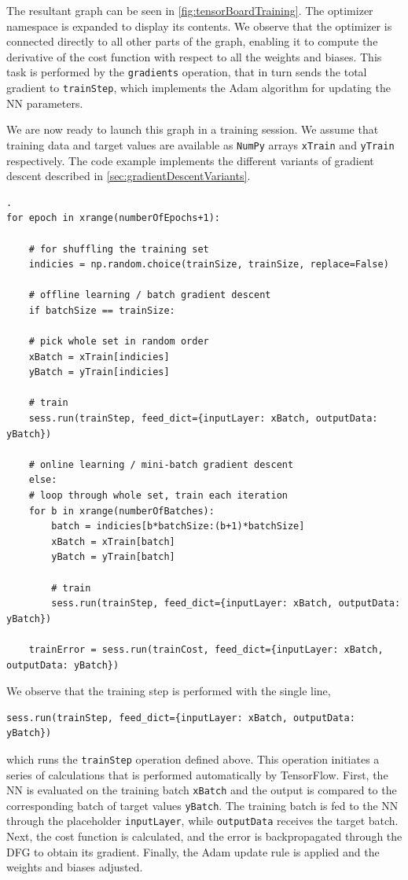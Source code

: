 \documentclass[twoside,english]{uiofysmaster}
\begin{document}
The resultant graph can be seen in \autoref{fig:tensorBoardTraining}. 
The optimizer namespace is expanded to display its contents. 
We observe that the optimizer is connected directly to all other parts of the graph, enabling it
to compute the derivative of the cost function with respect to all the weights and biases. This task is
performed by the \texttt{gradients} operation, that in turn sends the total gradient to \texttt{trainStep}, 
which implements the Adam algorithm for updating the NN parameters. 

We are now ready to launch this graph in a training session. We assume that training data
and target values are available as \texttt{NumPy} arrays \texttt{xTrain} and \texttt{yTrain} respectively. 
The code example implements the different variants of gradient descent described in \autoref{sec:gradientDescentVariants}. 
\begin{verbatim}.
for epoch in xrange(numberOfEpochs+1): 
    
    # for shuffling the training set
    indicies = np.random.choice(trainSize, trainSize, replace=False)
    
    # offline learning / batch gradient descent
    if batchSize == trainSize:    
	
	# pick whole set in random order               
	xBatch = xTrain[indicies]
	yBatch = yTrain[indicies]
	
	# train
	sess.run(trainStep, feed_dict={inputLayer: xBatch, outputData: yBatch})
	
    # online learning / mini-batch gradient descent
    else:                      
	# loop through whole set, train each iteration
	for b in xrange(numberOfBatches):
	    batch = indicies[b*batchSize:(b+1)*batchSize]
	    xBatch = xTrain[batch]
	    yBatch = yTrain[batch]
	    
	    # train
	    sess.run(trainStep, feed_dict={inputLayer: xBatch, outputData: yBatch})
	    
    trainError = sess.run(trainCost, feed_dict={inputLayer: xBatch, outputData: yBatch})
\end{verbatim}
We observe that the training step is performed with the single line,
\begin{verbatim}
sess.run(trainStep, feed_dict={inputLayer: xBatch, outputData: yBatch})
\end{verbatim}
which runs the \texttt{trainStep} operation defined above. This operation initiates a series of
calculations that is performed automatically by TensorFlow. 
First, the NN is evaluated on the training batch \texttt{xBatch} and the output is compared to the corresponding
batch of target values \texttt{yBatch}. The training batch is fed to the NN through the placeholder
\texttt{inputLayer}, while \texttt{outputData} receives the target batch. Next, the cost function 
is calculated, and the error is backpropagated through the DFG to obtain its gradient. Finally, 
the Adam update rule is applied and the weights and biases adjusted. 
\end{document}
